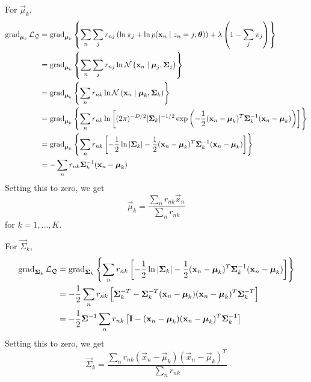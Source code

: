 For $\vec \mu_k$,
\begin{align*}
    \operatorname{\mathrm{grad}}_{\boldsymbol{\mathbf{\mu}}_k} \mathcal L_{\mathcal Q}  &= \operatorname{\mathrm{grad}}_{\boldsymbol{\mathbf{\mu}}_k} \left\{\sum_n \sum_j r_{nj} \left(\ln \pi_j + \ln p(\boldsymbol{\mathbf{x}}_n \mid z_n = j; \boldsymbol{\mathbf{\theta}})\right) + \lambda \left(1 - \sum_j \pi_j\right)\right\} \\
                                                &= \operatorname{\mathrm{grad}}_{\boldsymbol{\mathbf{\mu}}_k} \left\{\sum_n \sum_j r_{nj} \ln \operatorname{\mathcal N}\left(\boldsymbol{\mathbf{x}}_n \mid \boldsymbol{\mathbf{\mu}}_j, \boldsymbol{\mathbf{\Sigma}}_j\right)\right\} \\
                                                &= \operatorname{\mathrm{grad}}_{\boldsymbol{\mathbf{\mu}}_k} \left\{\sum_n r_{nk} \ln \operatorname{\mathcal N}\left(\boldsymbol{\mathbf{x}}_n \mid \boldsymbol{\mathbf{\mu}}_k, \boldsymbol{\mathbf{\Sigma}}_k\right)\right\} \\
                                                &= \operatorname{\mathrm{grad}}_{\boldsymbol{\mathbf{\mu}}_k} \left\{\sum_n r_{nk} \ln \left[(2\pi)^{-D / 2} |\boldsymbol{\mathbf{\Sigma}}_k|^{-1 / 2} \exp{\left(-\frac{1}{2}(\boldsymbol{\mathbf{x}}_n - \boldsymbol{\mathbf{\mu}}_k)^T \boldsymbol{\mathbf{\Sigma}}_k^{-1} (\boldsymbol{\mathbf{x}}_n - \boldsymbol{\mathbf{\mu}}_k)\right)}\right]\right\} \\
                                                &= \operatorname{\mathrm{grad}}_{\boldsymbol{\mathbf{\mu}}_k} \left\{\sum_n r_{nk} \left[-\frac{1}{2} \ln |\boldsymbol{\mathbf{\Sigma}}_k| - \frac{1}{2}(\boldsymbol{\mathbf{x}}_n - \boldsymbol{\mathbf{\mu}}_k)^T \boldsymbol{\mathbf{\Sigma}}_k^{-1} (\boldsymbol{\mathbf{x}}_n - \boldsymbol{\mathbf{\mu}}_k)\right]\right\} \\
                                                &= - \sum_n r_{nk} \boldsymbol{\mathbf{\Sigma}}_k^{-1}(\boldsymbol{\mathbf{x}}_n - \boldsymbol{\mathbf{\mu}}_k)
\end{align*}
Setting this to zero, we get
\begin{equation}
    \vec \mu_k = \frac{\sum_n r_{nk} \vec x_n}{\sum_n r_{nk}}
\end{equation}
for $k = 1, \dotsc, K$.

For $\vec \Sigma_k$,
\begin{align*}
    \operatorname{\mathrm{grad}}_{\boldsymbol{\mathbf{\Sigma}}_k} \mathcal L_{\mathcal Q}   &= \operatorname{\mathrm{grad}}_{\boldsymbol{\mathbf{\Sigma}}_k} \left\{\sum_n r_{nk} \left[-\frac{1}{2} \ln |\boldsymbol{\mathbf{\Sigma}}_k| - \frac{1}{2}(\boldsymbol{\mathbf{x}}_n - \boldsymbol{\mathbf{\mu}}_k)^T \boldsymbol{\mathbf{\Sigma}}_k^{-1} (\boldsymbol{\mathbf{x}}_n - \boldsymbol{\mathbf{\mu}}_k)\right]\right\} \\
                                                    &= -\frac{1}{2} \sum_n r_{nk} \left[\boldsymbol{\mathbf{\Sigma}}_k^{-T} - \boldsymbol{\mathbf{\Sigma}}_k^{-T}(\boldsymbol{\mathbf{x}}_n - \boldsymbol{\mathbf{\mu}}_k)(\boldsymbol{\mathbf{x}}_n - \boldsymbol{\mathbf{\mu}}_k)^T \boldsymbol{\mathbf{\Sigma}}_k^{-T}\right] \\
                                                    &= -\frac{1}{2} \boldsymbol{\mathbf{\Sigma}}^{-1} \sum_n r_{nk} \left[\boldsymbol{\mathbf{I}} - (\boldsymbol{\mathbf{x}}_n - \boldsymbol{\mathbf{\mu}}_k)(\boldsymbol{\mathbf{x}}_n - \boldsymbol{\mathbf{\mu}}_k)^T \boldsymbol{\mathbf{\Sigma}}_k^{-1}\right]
\end{align*}
Setting this to zero, we get
\begin{equation}
    \vec \Sigma_k = \frac{\sum_n r_{nk}(\vec x_n - \vec \mu_k)(\vec x_n - \vec \mu_k)^T}{\sum_n r_{nk}}
\end{equation}